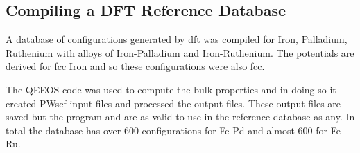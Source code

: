 \subsection[DFT Reference Database]{Compiling a DFT Reference Database}


A database of configurations generated by \acrshort{dft} was compiled for Iron, Palladium, Ruthenium with alloys of Iron-Palladium and Iron-Ruthenium.  The potentials are derived for \acrshort{fcc} Iron and so these configurations were also \acrshort{fcc}.

The QEEOS code was used to compute the bulk properties and in doing so it created PWscf input files and processed the output files.  These output files are saved but the program and are as valid to use in the reference database as any.  In total the database has over 600 configurations for Fe-Pd and almost 600 for Fe-Ru.  

